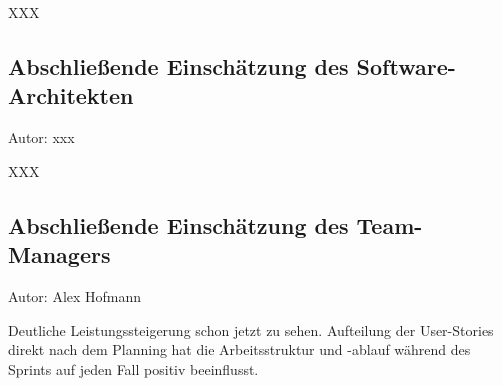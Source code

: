 XXX

\subsection{Abschließende Einschätzung des Software-Architekten}
{\small Autor: xxx}

XXX

\subsection{Abschließende Einschätzung des Team-Managers}
{\small Autor: Alex Hofmann}

Deutliche Leistungssteigerung schon jetzt zu sehen. Aufteilung der User-Stories direkt nach dem Planning hat die Arbeitsstruktur und -ablauf während des Sprints auf jeden Fall positiv beeinflusst.

